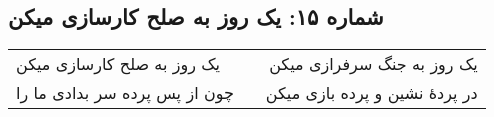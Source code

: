 \begin{center}
\section*{شماره ۱۵: یک روز به صلح کارسازی میکن}
\label{sec:015}
\begin{longtable}{l p{0.5cm} r}
یک روز به صلح کارسازی میکن
&&
یک روز به جنگ سرفرازی میکن
\\
چون از پس پرده سر بدادی ما را
&&
در پردهٔ نشین و پرده بازی میکن
\\
\end{longtable}
\end{center}
